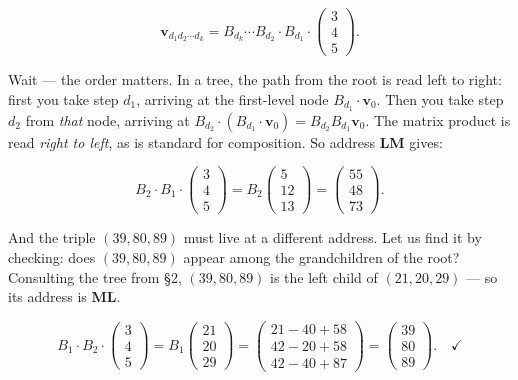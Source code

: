 \documentclass[11pt,openany]{book}
\theoremstyle{definition}
\theoremstyle{plain}
\theoremstyle{remark}
\begin{document}
$$\mathbf{v}_{d_1 d_2 \cdots d_k} = B_{d_k} \cdots B_{d_2} \cdot B_{d_1} \cdot \begin{pmatrix} 3 \\ 4 \\ 5 \end{pmatrix}.$$

Wait — the order matters. In a tree, the path from the root is read left to right: first you take step $d_1$, arriving at the first-level node $B_{d_1} \cdot \mathbf{v}_0$. Then you take step $d_2$ from \textit{that} node, arriving at $B_{d_2} \cdot (B_{d_1} \cdot \mathbf{v}_0) = B_{d_2} B_{d_1} \mathbf{v}_0$. The matrix product is read \textit{right to left}, as is standard for composition. So address \textbf{LM} gives:

$$B_2 \cdot B_1 \cdot \begin{pmatrix} 3 \\ 4 \\ 5 \end{pmatrix} = B_2 \begin{pmatrix} 5 \\ 12 \\ 13 \end{pmatrix} = \begin{pmatrix} 55 \\ 48 \\ 73 \end{pmatrix}.$$

And the triple $(39, 80, 89)$ must live at a different address. Let us find it by checking: does $(39, 80, 89)$ appear among the grandchildren of the root? Consulting the tree from §2, $(39, 80, 89)$ is the left child of $(21, 20, 29)$ — so its address is \textbf{ML}.

$$B_1 \cdot B_2 \cdot \begin{pmatrix} 3 \\ 4 \\ 5 \end{pmatrix} = B_1 \begin{pmatrix} 21 \\ 20 \\ 29 \end{pmatrix} = \begin{pmatrix} 21 - 40 + 58 \\ 42 - 20 + 58 \\ 42 - 40 + 87 \end{pmatrix} = \begin{pmatrix} 39 \\ 80 \\ 89 \end{pmatrix}. \quad \checkmark$$
\end{document}

